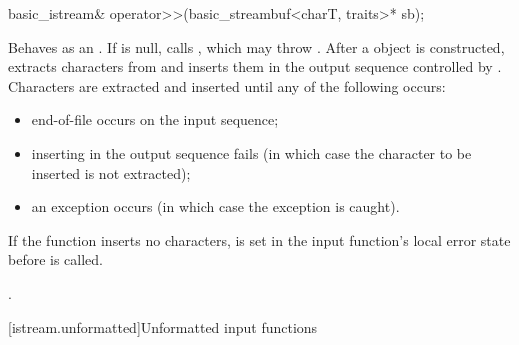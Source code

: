 %
\begin{itemdecl}
basic_istream& operator>>(basic_streambuf<charT, traits>* sb);
\end{itemdecl}

\begin{itemdescr}
\pnum
\effects
Behaves as an .
If  is null, calls
,
which may throw
.
After a  object is constructed, extracts
characters from
and inserts them in the output sequence controlled by .
Characters are extracted and inserted until any of the following occurs:
\begin{itemize}
\item
end-of-file occurs on the input sequence;
\item
inserting in the output sequence fails
(in which case the character to be inserted is not extracted);
\item
an exception occurs (in which case the exception is caught).
\end{itemize}

\pnum
If the function inserts no characters,
 is set in the input function's local error state
before  is called.

\pnum
\returns
{}.
\end{itemdescr}

[istream.unformatted]{Unformatted input functions}

